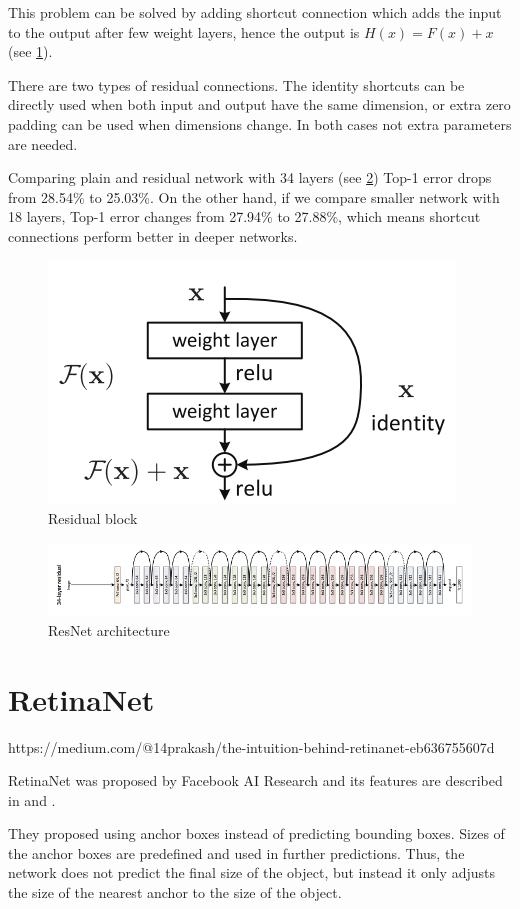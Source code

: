 \documentclass[twoside]{ctuthesis}
\theoremstyle{plain}
\theoremstyle{definition}
\theoremstyle{note}
\begin{document}
This problem can be solved by adding shortcut connection which adds the input to the output after few weight layers, hence the output is $H(x) = F(x) + x$ (see \ref{resnet_block}). 

There are two types of residual connections. The identity shortcuts can be directly used when both input and output have the same dimension, or extra zero padding can be used when dimensions change. In both cases not extra parameters are needed. 

Comparing plain and residual network with 34 layers (see \ref{resnet}) Top-1 error drops from 28.54\% to 25.03\%. On the other hand, if we compare smaller network with 18 layers, Top-1 error changes from 27.94\% to 27.88\%, which means shortcut connections perform better in deeper networks. 

\begin{figure}[h]
\caption{Residual block}
\label{resnet_block}
\includegraphics[width=.5\textwidth]{images/used_networks/resnet_block.png}
\end{figure}

\begin{figure}[h]
\caption{ResNet architecture}
\label{resnet}
\includegraphics[width=\textwidth]{images/used_networks/resnet.png}
\end{figure}
\section{RetinaNet}
https://medium.com/@14prakash/the-intuition-behind-retinanet-eb636755607d

RetinaNet was proposed by Facebook AI Research and its features are described in \cite{lin_dollar_girshick_he_hariharan_belongie_2017} and \cite{lin_goyal_girshick_he_dollar_2017}. 

They proposed using anchor boxes instead of predicting bounding boxes. Sizes of the anchor boxes are predefined and used in further predictions. Thus, the network does not predict the final size of the object, but instead it only adjusts the size of the nearest anchor to the size of the object. 
\end{document}

